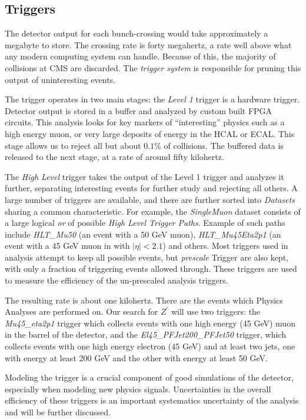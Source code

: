 \subsection{Triggers}
The detector output for each bunch-crossing would take approximately a megabyte to store. The crossing rate is forty megahertz, a rate well above what any modern computing system can handle. Because of this, the majority of collisions at CMS are discarded. The \textit{trigger system} is responsible for pruning this output of uninteresting events.

The trigger operates in two main stages: the \textit{Level 1} trigger is a hardware trigger. Detector output is stored in a buffer and analyzed by custom built FPGA circuits. This analysis looks for key markers of ``interesting'' physics such as a high energy muon, or very large deposits of energy in the HCAL or ECAL. This stage allows us to reject all but about $0.1\%$ of collisions. The buffered data is released to the next stage, at a rate of around fifty kilohertz.

The \textit{High Level} trigger takes the output of the Level 1 trigger and analyzes it further, separating interesting events for further study and rejecting all others. A large number of triggers are available, and there are further sorted into \textit{Datasets} sharing a common characteristic. For example, the \textit{SingleMuon} dataset consists of a large logical \textit{or} of possible \textit{ High Level Trigger Paths}. Example of such paths include \textit{HLT\_Mu50} (an event with a 50 GeV muon), \textit{HLT\_Mu45Eta2p1} (an event with a 45 GeV muon in with $|\eta| < 2.1$) and others. Most triggers used in analysis attempt to keep all possible events, but \textit{prescale} Trigger are also kept, with only a fraction of triggering events allowed through. These triggers are used to measure the efficiency of the un-prescaled analysis triggers.

The resulting rate is about one kilohertz. There are the events which Physics Analyses are performed on. Our search for $Z^\prime$ will use two triggers: the \textit{Mu45\_eta2p1} trigger which collects events with one high energy (45 GeV) muon in the barrel of the detector, and the \textit{El45\_PFJet200\_PFJet50} trigger, which collects events with one high energy electron (45 GeV) and at least two jets, one with energy at least 200 GeV and the other with energy at least 50 GeV.

Modeling the trigger is a crucial component of good simulations of the detector, especially when modeling new physics signals. Uncertainties in the overall efficiency of these triggers is an important systematics uncertainty of the analysis and will be further discussed.

